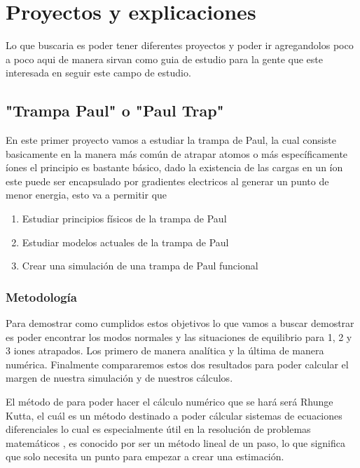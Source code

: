 \documentclass{article}
\begin{document}
\section*{Proyectos y explicaciones}
Lo que buscaria es poder tener diferentes proyectos y poder ir agregandolos poco a poco aqui de manera sirvan como guia de estudio para la gente que
este interesada en seguir este campo de estudio.
\subsection*{"Trampa Paul" o "Paul Trap"}
En este primer proyecto vamos a estudiar la trampa de Paul, la cual consiste basicamente en la manera más común de atrapar atomos o más específicamente íones
el principio es bastante básico, dado la existencia de las cargas en un íon este puede ser encapsulado por gradientes electricos al generar un punto de menor 
energia, esto va a permitir que 
\begin{enumerate}
\item Estudiar principios físicos de la trampa de Paul

\item Estudiar modelos actuales de la trampa de Paul

\item Crear una simulación de una trampa de Paul funcional

\end{enumerate}



\subsubsection*{Metodología}

Para demostrar como cumplidos estos objetivos lo que vamos a buscar demostrar es poder encontrar los modos normales
y las situaciones de equilibrio para 1, 2 y 3 iones atrapados. Los primero de manera
analítica y la última de manera numérica. Finalmente compararemos estos dos resultados para 
poder calcular el margen de nuestra simulación y de nuestros cálculos.

El método de para poder hacer el cálculo numérico que se hará será Rhunge Kutta, el cuál es un
método destinado a poder cálcular sistemas de ecuaciones diferenciales lo cual es especialmente
útil en la resolución de problemas matemáticos \cite{Rhunge-Kutta}, es conocido 
por ser un método lineal de un paso, lo que significa que solo necesita un punto para 
empezar a crear una estimación.
\end{document}
